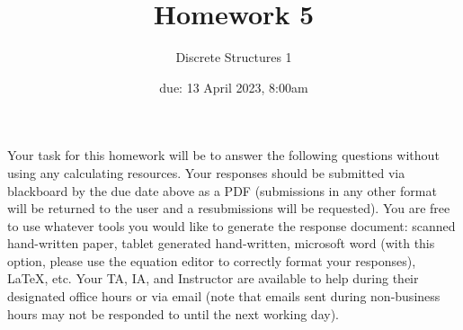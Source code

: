 \documentclass[11pt, oneside]{article}   	%
\title{Homework 5}
\author{Discrete Structures 1}
\date{due: 13 April 2023, 8:00am}							%
\begin{document}
\maketitle

Your task for this homework will be to answer the following questions without using any calculating resources. 
Your responses should be submitted via blackboard by the due date above as a PDF (submissions in any other format will be returned to the user and a resubmissions will be requested). 
You are free to use whatever tools you would like to generate the response document: 
scanned hand-written paper, 
tablet generated hand-written, 
microsoft word (with this option, please use the equation editor to correctly format your responses), 
\LaTeX, etc.
Your TA, IA, and Instructor are available to help during their designated office hours or via email 
(note that emails sent during non-business hours may not be responded to until the next working day). 
\end{document}
